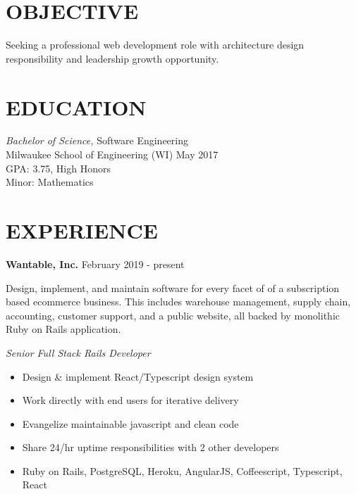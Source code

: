 \documentclass[line,margin]{res}
\begin{document}

\address{austin.dev@protonmail.com | (𝟺𝟷𝟺) 𝟹𝟹𝟺-𝟺𝟶𝟼𝟷}

\begin{resume}

\section{OBJECTIVE}
	Seeking a professional web development role with architecture design responsibility and leadership growth opportunity.

\section{EDUCATION}
	{\sl Bachelor of Science,} Software Engineering \\
	Milwaukee School of Engineering (WI) \hfill May 2017 \\
	GPA: 3.75, High Honors \\
	Minor: Mathematics

\section{EXPERIENCE}

	\textbf{Wantable, Inc.} \hfill February 2019 - present

	Design, implement, and maintain software for every facet of of a subscription based ecommerce business. This includes warehouse management, supply chain, accounting, customer support, and a public website, all backed by monolithic Ruby on Rails application.

	{\sl Senior Full Stack Rails Developer} \\

	\begin{itemize}
		\item Design \& implement React/Typescript design system
		\item Work directly with end users for iterative delivery
		\item Evangelize maintainable javascript and clean code
		\item Share 24/hr uptime responsibilities with 2 other developers
		\item Ruby on Rails, PostgreSQL, Heroku, AngularJS, Coffeescript, Typescript, \\ React
	\end{itemize}


\end{resume}
\end{document}
